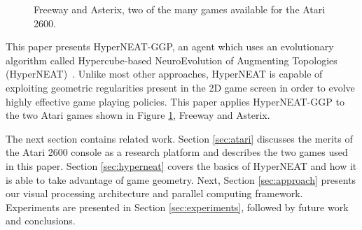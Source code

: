 \documentclass{sig-alternate}
\begin{document}
\begin{figure}[t]
  \centering
  \hspace{.1in}
  \hspace{.1in}
 \caption{Freeway and Asterix, two of the many games available for the Atari 2600.}
 \label{fig:samplegames}
\end{figure}

This paper presents HyperNEAT-GGP, an agent which uses an evolutionary algorithm called Hypercube-based NeuroEvolution of Augmenting Topologies (HyperNEAT)~\cite{gauci08}. Unlike most other approaches, HyperNEAT is capable of exploiting geometric regularities present in the 2D game screen in order to evolve highly effective game playing policies. This paper applies HyperNEAT-GGP to the two Atari games shown in Figure \ref{fig:samplegames}, Freeway and Asterix.

The next section contains related work. Section \ref{sec:atari} discusses the merits of the Atari 2600 console as a research platform and describes the two games used in this paper. Section \ref{sec:hyperneat} covers the basics of HyperNEAT and how it is able to take advantage of game geometry. Next, Section \ref{sec:approach} presents our visual processing architecture and parallel computing framework. Experiments are presented in Section \ref{sec:experiments}, followed by future work and conclusions.
\end{document}
